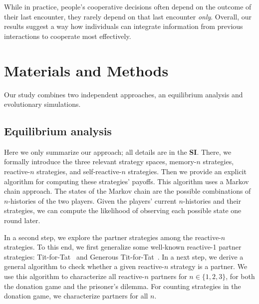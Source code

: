 \documentclass[9pt,twocolumn,twoside]{pnas-new}
\def\SI{\textbf{SI}}
\begin{document}
While in practice, people's cooperative decisions often depend on the outcome of their last encounter, they rarely depend on that last encounter {\it only}. 
Overall, our results suggest a way how individuals can integrate information from previous interactions to cooperate most effectively.  


\section*{Materials and Methods}\label{section:materials_and_methods}

Our study combines two independent approaches, an equilibrium analysis and evolutionary simulations.

\subsection*{Equilibrium analysis} 
Here we only summarize our approach; all details are in the \SI. 
There, we formally introduce the three relevant strategy spaces, memory-$n$ strategies, reactive-$n$ strategies, and self-reactive-$n$ strategies. 
Then we provide an explicit algorithm for computing these strategies' payoffs. 
This algorithm uses a Markov chain approach. 
The states of the Markov chain are the possible combinations of $n$-histories of the two players. 
Given the players' current $n$-histories and their strategies, we can compute the likelihood of observing each possible state one round later. 

In a second step, we explore the partner strategies among the reactive-$n$ strategies. 
To this end, we first generalize some well-known reactive-1 partner strategies: Tit-for-Tat~\citep{axelrod:AAAS:1981} and Generous Tit-for-Tat~\citep{nowak:Nature:1992,molander:jcr:1985}. 
In a next step, we derive a general algorithm to check whether a given reactive-$n$ strategy is a partner. 
We use this algorithm to characterize all reactive-$n$ partners for $n\!\in\!\{1,2,3\}$, for both the donation game and the prisoner's dilemma. 
For counting strategies in the donation game, we characterize partners for all $n$.\\
\end{document}
